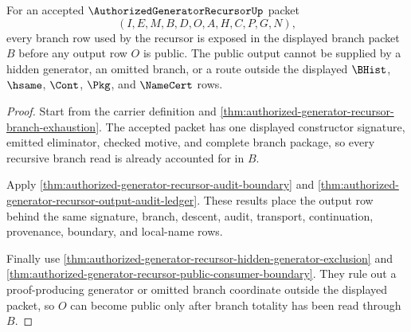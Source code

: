 \begin{theorem}
\label{thm:authorized-generator-recursor-root-branch-row-totality}
For an accepted $\AuthorizedGeneratorRecursorUp$ packet
$$
(I,E,M,B,D,O,A,H,C,P,G,N),
$$
every branch row used by the recursor is exposed in the displayed branch
packet $B$ before any output row $O$ is public. The public output cannot be
supplied by a hidden generator, an omitted branch, or a route outside the
displayed $\BHist$, $\hsame$, $\Cont$, $\Pkg$, and $\NameCert$ rows.
\end{theorem}
\begin{proof}
Start from the carrier definition and
\autoref{thm:authorized-generator-recursor-branch-exhaustion}. The accepted
packet has one displayed constructor signature, emitted eliminator, checked
motive, and complete branch package, so every recursive branch read is already
accounted for in $B$.

Apply \autoref{thm:authorized-generator-recursor-audit-boundary} and
\autoref{thm:authorized-generator-recursor-output-audit-ledger}. These results
place the output row behind the same signature, branch, descent, audit,
transport, continuation, provenance, boundary, and local-name rows.

Finally use
\autoref{thm:authorized-generator-recursor-hidden-generator-exclusion} and
\autoref{thm:authorized-generator-recursor-public-consumer-boundary}. They rule
out a proof-producing generator or omitted branch coordinate outside the
displayed packet, so $O$ can become public only after branch totality has been
read through $B$.
\end{proof}

